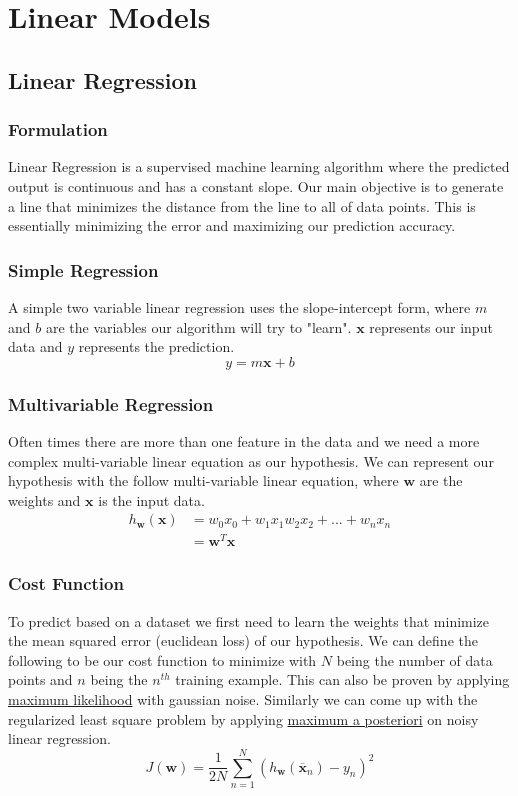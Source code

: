 \documentclass[12pt]{article}
\begin{document}
        
\section{Linear Models}
    \subsection{Linear Regression}
    \subsubsection{Formulation}
        Linear Regression is a supervised machine learning algorithm where the predicted output is continuous and has a constant slope. Our main objective is to generate a line that
        minimizes the distance from the line to all of data points. This is essentially minimizing the error and maximizing our prediction accuracy.
    
    \subsubsection{Simple Regression}
        A simple two variable linear regression uses the slope-intercept form, where $m$ and $b$ are the variables our algorithm will try to "learn". $\boldsymbol{x}$ represents our input data
        and $y$ represents the prediction.
        $$ y = m \boldsymbol{x} + b$$

    \subsubsection{Multivariable Regression}
        Often times there are more than one feature in the data and we need a more complex multi-variable linear equation as our hypothesis. We can represent our hypothesis with the
        follow multi-variable linear equation, where $\boldsymbol{w}$ are the weights and $\boldsymbol{x}$ is the input data.
        \begin{align*}
            h_{\boldsymbol{w}}(\boldsymbol{x}) &= w_0x_0 + w_1x_1 w_2x_2 + ... + w_nx_n \\
            &= \boldsymbol{w}^T\boldsymbol{x}
        \end{align*}

    \subsubsection{Cost Function}
        To predict based on a dataset we first need to learn the weights that minimize the mean squared error (euclidean loss) of our hypothesis. We can define the following to be our cost function to
        minimize with $N$ being the number of data points and $n$ being the $n^{th}$ training example. This can also be proven by applying \hyperlink{Maximum Likelihood}{maximum likelihood} with
        gaussian noise. Similarly we can come up with the regularized least square problem by applying \hyperlink{Maximum a Posteriori}{maximum a posteriori} on noisy linear regression.
        $$ J(\boldsymbol{w}) = \frac{1}{2N}\sum_{n=1}^{N}(h_{\boldsymbol{w}}(\overline{\boldsymbol{x}}_n) - y_n)^2 $$
\end{document}
